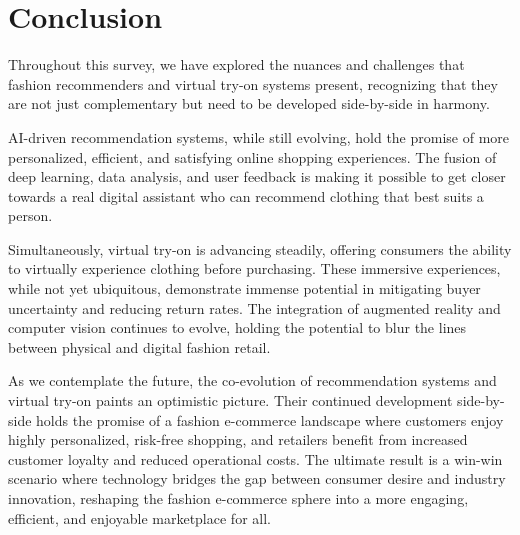 \section{\textbf{Conclusion}} \label{section:conclusion}
	Throughout this survey, we have explored the nuances and challenges that fashion recommenders and virtual try-on systems present, recognizing that they are not just complementary but need to be developed side-by-side in harmony.

	AI-driven recommendation systems, while still evolving, hold the promise of more personalized, efficient, and satisfying online shopping experiences. The fusion of deep learning, data analysis, and user feedback is making it possible to get closer towards a real digital assistant who can recommend clothing that best suits a person.

	Simultaneously, virtual try-on is advancing steadily, offering consumers the ability to virtually experience clothing before purchasing. These immersive experiences, while not yet ubiquitous, demonstrate immense potential in mitigating buyer uncertainty and reducing return rates. The integration of augmented reality and computer vision continues to evolve, holding the potential to blur the lines between physical and digital fashion retail.

	As we contemplate the future, the co-evolution of recommendation systems and virtual try-on paints an optimistic picture. Their continued development side-by-side holds the promise of a fashion e-commerce landscape where customers enjoy highly personalized, risk-free shopping, and retailers benefit from increased customer loyalty and reduced operational costs. The ultimate result is a win-win scenario where technology bridges the gap between consumer desire and industry innovation, reshaping the fashion e-commerce sphere into a more engaging, efficient, and enjoyable marketplace for all.